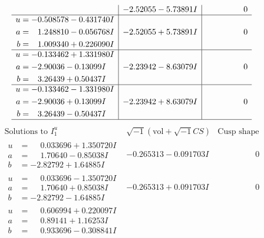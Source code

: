 \documentclass[1p]{elsarticle_modified}
\theoremstyle{definition}
\newcommand{\I}{\sqrt{-1}}
\begin{document}
$$\begin{array}{c|c|c}
 & -2.52055 - 5.73891 I & \phantom{-0.000000 } 0 \\ \hline\begin{aligned}
u &= -0.508578 - 0.431740 I \\
a &= \phantom{-}1.248810 - 0.056768 I \\
b &= \phantom{-}1.009340 + 0.226090 I\end{aligned}
 & -2.52055 + 5.73891 I & \phantom{-0.000000 } 0 \\ \hline\begin{aligned}
u &= -0.133462 + 1.331980 I \\
a &= -2.90036 - 0.13099 I \\
b &= \phantom{-}3.26439 + 0.50437 I\end{aligned}
 & -2.23942 - 8.63079 I & \phantom{-0.000000 } 0 \\ \hline\begin{aligned}
u &= -0.133462 - 1.331980 I \\
a &= -2.90036 + 0.13099 I \\
b &= \phantom{-}3.26439 - 0.50437 I\end{aligned}
 & -2.23942 + 8.63079 I & \phantom{-0.000000 } 0\\
 \hline 
 \end{array}$$\newpage$$\begin{array}{c|c|c}  
\text{Solutions to }I^u_{1}& \I (\text{vol} + \sqrt{-1}CS) & \text{Cusp shape}\\
 \hline 
\begin{aligned}
u &= \phantom{-}0.033696 + 1.350720 I \\
a &= \phantom{-}1.70640 - 0.85038 I \\
b &= -2.82792 + 1.64885 I\end{aligned}
 & -0.265313 - 0.091703 I & \phantom{-0.000000 } 0 \\ \hline\begin{aligned}
u &= \phantom{-}0.033696 - 1.350720 I \\
a &= \phantom{-}1.70640 + 0.85038 I \\
b &= -2.82792 - 1.64885 I\end{aligned}
 & -0.265313 + 0.091703 I & \phantom{-0.000000 } 0 \\ \hline\begin{aligned}
u &= \phantom{-}0.606994 + 0.220097 I \\
a &= \phantom{-}0.89141 + 1.16253 I \\
b &= \phantom{-}0.933696 - 0.308841 I\end{aligned}

\end{array}$$
\end{document}
